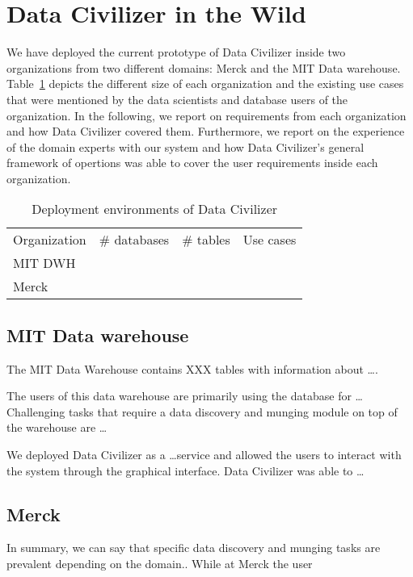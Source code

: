 \section{Data Civilizer in the Wild}
\label{sec:wild}

We have deployed the current prototype of Data Civilizer inside two organizations from two different domains: Merck and the MIT Data warehouse. Table~\ref{tab:dataCivInTheWild} depicts the different size of each organization and the existing use cases that were mentioned by the data scientists and database users of the organization. In the following, we report on requirements from each organization and how Data Civilizer covered them. Furthermore, we report on the experience of the domain experts with our system and how Data Civilizer's general framework of opertions was able to cover the user requirements inside each organization.

\begin{table}
\caption{Deployment environments of Data Civilizer}\label{tab:dataCivInTheWild}
\begin{tabular}{|l|l|l|l|}
\hline
Organization & \# databases & \# tables & Use cases\\
MIT DWH & & & \\
Merck & & & \\
\hline
\end{tabular}
\end{table}

\subsection{MIT Data warehouse}

The MIT Data Warehouse contains XXX tables with information about \ldots.

The users of this data warehouse are primarily using the database for \ldots
Challenging tasks that require a data discovery and munging module on top of the warehouse are \ldots

We deployed Data Civilizer as a \ldots service and allowed the users to interact with the system through the graphical interface. 
Data Civilizer was able to \ldots

\subsection{Merck}



In summary, we can say that specific data discovery and munging tasks are prevalent depending on the domain.. While at Merck the user 

